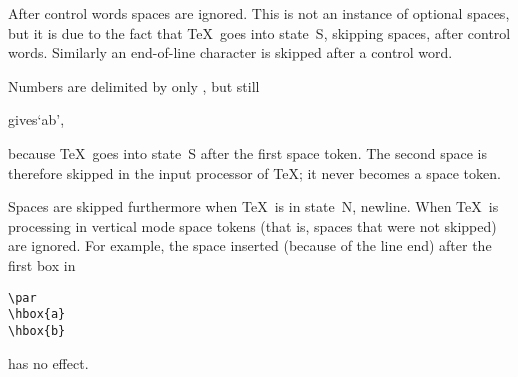 \documentclass{book}
\begin{document}
After control words spaces are ignored. This is not an
instance of optional spaces, but it is due to the fact that
\TeX\ goes into state~{\italic S}, skipping spaces, after control
words. Similarly an end-of-line character is skipped
after a control word.

Numbers are delimited by only ,
but still
\begin{disp}\quad gives\quad `ab',\end{disp}
because \TeX\ goes into state~{\italic S} after the first
space token. The second space is therefore skipped 
in the input processor of \TeX; it never becomes a space token.

Spaces are skipped furthermore when \TeX\ is in state~{\italic N},
newline. When \TeX\ is processing in vertical mode
space tokens (that is, spaces that were not skipped)
are ignored. For example, the space inserted (because of the line end)
after the first box in
\begin{verbatim}
\par
\hbox{a}
\hbox{b}
\end{verbatim}
has no effect.
\end{document}
